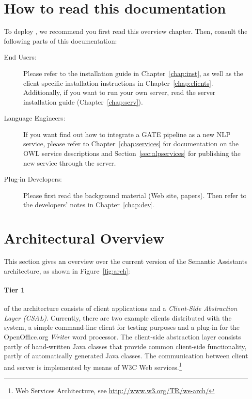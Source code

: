 \section{How to read this documentation}
To deploy \sa, we recommend you first read this overview chapter.
Then, consult the following parts of this documentation:

\begin{description}
\item[End Users:] Please refer to the installation guide in
  Chapter~\ref{chap:inst}, as well as the client-specific installation
  instructions in Chapter~\ref{chap:clients}. Additionally, if you
  want to run your own server, read the server installation guide
  (Chapter~\ref{chap:serv}).

\item[Language Engineers:] If you want find out how to integrate a
  GATE pipeline as a new NLP service, please refer to
  Chapter~\ref{chap:services} for documentation on the OWL service
  descriptions and Section~\ref{sec:nlpservices} for publishing the
  new service through the \sa server.

\item[Plug-in Developers:] Please first read the background material
  (Web site, papers). Then refer to the developers' notes in
  Chapter~\ref{chap:dev}.
\end{description}

\section{Architectural Overview}
\label{sec:implementation}
This section gives an overview over the current version of the Semantic
Assistants architecture, as shown in Figure~\ref{fig:arch}:

\paragraph{Tier 1} of the architecture consists of client applications
and a \emph{Client-Side Abstraction Layer (CSAL)}. Currently, there
are two example clients distributed with the system, a simple
command-line client for testing purposes and a plug-in for the
OpenOffice.org \emph{Writer} word processor. The client-side abstraction
layer consists partly of hand-written Java classes that provide
common client-side functionality, partly of automatically generated
Java classes. The communication between client and server is
implemented by means of W3C Web services.\footnote{Web Services Architecture, see
  \url{http://www.w3.org/TR/ws-arch/}} 

